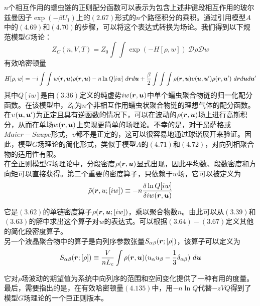$n$个相互作用的蠕虫链的正则配分函数可以表示为包含上述非键段相互作用的玻尔兹曼因子$\exp (-\beta U_1)$上的$(2.67)$形式的$n$个路径积分的乘积。通过引用模型$A$中的$(4.69)$和$(4.70)$的步骤，可以将这个表达式转换为场论。我们得到以下规范模型$G$场论：\\
\begin{equation}
Z_{C}(n,V,T)=Z_{0} \int  \int  \exp (-H[\rho,w])~\mathcal{D} \rho \mathcal{D} w
\end{equation}
有效哈密顿量\\ 
\begin{equation}
H[\rho,w]= -i \int \int w(\bm{r},\bm{u}) \rho(\bm{r},\bm{u})-n \ln Q[i w] ~d\bm{r} d\bm{u}+\frac{\beta}{2} \int \int \int  \rho(\bm{r},\bm{u}) \upsilon(\bm{u},\bm{u}') \rho(\bm{r},\bm{u}')~ d\bm{r} d\bm{u} d\bm{u}'
\end{equation}
其中$Q[i w]$是由$(3.36)$定义的纯虚势$i w(\bm{r},\bm{u})$中单个蠕虫聚合物链的归一化配分函数。在该模型中，$Z_0$为$n$个非相互作用蠕虫状聚合物链的理想气体的配分函数。\\

在$\upsilon(\bm{u},\bm{u}')$为正定且具有逆函数的情况下，可以在波动的$\rho(\bm{r},\bm{u})$场上进行高斯积分，从而在单场$w(\bm{r},\bm{u})$上实现更简单的场理论。不幸的是，对于昂萨格或$Maier-Saupe$形式，$\upsilon$都不是正定的，这可以很容易地通过球谐展开来验证。因此，模型$G$场理论的简化形式，类似于模型$A$的$(4.71)$和$(4.72)$，对向列相聚合物的适用性有限。\\

在全正则模型$G$场理论中，分段密度$\rho(\bm{r},\bm{u})$显式出现，因此平均数、段数密度和方向矩可以直接获得。第二个重要的密度算子，只依赖于$w$场，它可以被定义为\\
\begin{equation}
\tilde{\rho}(\bm{r},u;[i w]) \equiv -n \frac{\delta \ln Q[i w]}{\delta i w(\bm{r},\bm{u})}
\end{equation}

它是$(3.62)$的单链密度算子$\rho(\bm{r},\bm{u};[i w])$，乘以聚合物数$n$。由此可以从$(3.39)$和$(3.63)$的解中求出这个算子对$w$的表达式。可以根据$(3.64)-(3.67)$定义其他的简化段密度算子。\\

另一个液晶聚合物中的算子是向列序参数张量$S_{\alpha \beta}(\bm{r};[\rho])$，该算子可以定义为\\
\begin{equation}
S_{\alpha \beta}(\bm{r};[\rho]) \equiv \frac{V}{n L_{c}} \int \rho(\bm{r},\bm{u})(u_{\alpha} u_{\beta}-\frac{1}{3} \delta_{\alpha \beta})~d\bm{u}
\end{equation}

它对$\rho$场波动的期望值为系统中向列序的范围和空间变化提供了一种有用的度量。最后，需要指出的是，在有效哈密顿量$(4.135)$中，用$-n \ln Q$代替$-z VQ$得到了模型$G$场理论的一个巨正则版本。\\

